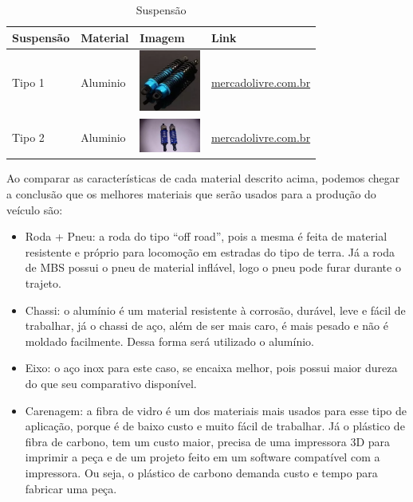   \begin{table}[!htbp]
  \begin{center}
  \caption{Suspensão}
  \begin{tabular}{|p{3cm}|p{3cm}|p{2cm}|p{4cm}|}
  \hline
  \textbf{Suspensão} & \textbf{Material} & \textbf{Imagem} & \textbf{Link}\\\hline\hline
  Tipo 1 & Aluminio & \includegraphics[width=2cm]{figuras/suspensao_aluminio_1.eps} & \href{http://produto.mercadolivre.com.br/MLB-689668697-par-amortecedor-aluminio-hsp-106004-06038-06062-rc-110-97mm-_JM}{mercadolivre.com.br}\\\hline
  Tipo 2 & Aluminio & \includegraphics[width=2cm]{figuras/suspensao_aluminio_2.eps} & \href{http://produto.mercadolivre.com.br/MLB-722851070-par-de-amortecedor-75mm-para-automodelo-110-_JM}{mercadolivre.com.br}\\\hline
  \end{tabular}
  \end{center}
  \end{table}
  
  
  Ao comparar as características de cada material descrito acima, podemos chegar a conclusão que os melhores materiais que 
  serão usados para a produção do veículo são:
  
  \begin{itemize}
    \item Roda + Pneu: a roda do tipo “off road”, pois a mesma é feita de material resistente e próprio para locomoção em estradas do tipo de terra. Já a roda de MBS possui o pneu de material inflável, logo o pneu pode furar durante o trajeto.
    \item Chassi: o alumínio é um material resistente à corrosão, durável, leve e fácil de trabalhar, já o chassi de aço, além de ser mais caro, é mais pesado e não é moldado facilmente. Dessa forma será utilizado o alumínio.
    \item Eixo: o aço inox para este caso, se encaixa melhor, pois possui maior dureza do que seu comparativo disponível.
    \item Carenagem: a fibra de vidro é um dos materiais mais usados para esse tipo de aplicação, porque é de baixo custo e muito fácil de trabalhar. Já o plástico de fibra de carbono, tem um custo maior, precisa de uma impressora 3D para imprimir a peça e de um projeto feito em um software compatível com a  impressora. Ou seja, o plástico de carbono demanda custo e tempo para fabricar uma peça.
  \end{itemize}
  
